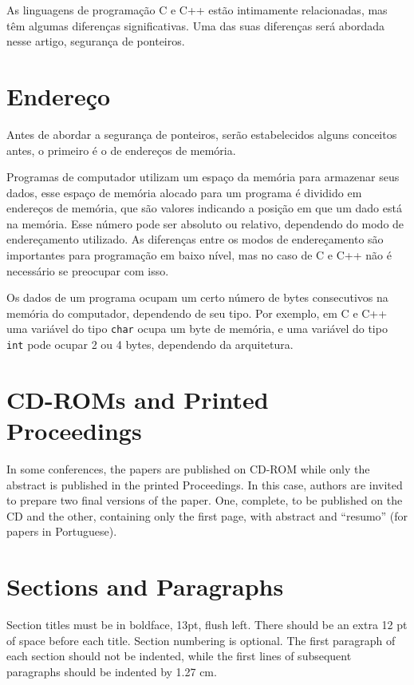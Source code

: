 \documentclass[12pt]{article}
\begin{document}
As linguagens de programação C e C++ estão intimamente relacionadas, mas têm algumas diferenças significativas. Uma das suas diferenças será abordada nesse artigo, segurança de ponteiros.

\section{Endereço} \label{sec:endereco}
Antes de abordar a segurança de ponteiros, serão estabelecidos alguns conceitos antes, o primeiro é o de endereços de memória.

Programas de computador utilizam um espaço da memória para armazenar seus dados, esse espaço de memória alocado para um programa é dividido em endereços de memória, que são valores indicando a posição em que um dado está na memória. Esse número pode ser absoluto ou relativo, dependendo do modo de endereçamento utilizado. As diferenças entre os modos de endereçamento são importantes para programação em baixo nível, mas no caso de C e C++ não é necessário se preocupar com isso.

Os dados de um programa ocupam um certo número de bytes consecutivos na memória do computador, dependendo de seu tipo. Por exemplo, em C e C++ uma variável do tipo \texttt{char} ocupa um byte de memória, e uma variável do tipo \texttt{int} pode ocupar 2 ou 4 bytes, dependendo da arquitetura.

\section{CD-ROMs and Printed Proceedings}

In some conferences, the papers are published on CD-ROM while only the
abstract is published in the printed Proceedings. In this case, authors are
invited to prepare two final versions of the paper. One, complete, to be
published on the CD and the other, containing only the first page, with
abstract and ``resumo'' (for papers in Portuguese).

\section{Sections and Paragraphs}

Section titles must be in boldface, 13pt, flush left. There should be an extra
12 pt of space before each title. Section numbering is optional. The first
paragraph of each section should not be indented, while the first lines of
subsequent paragraphs should be indented by 1.27 cm.
\end{document}
